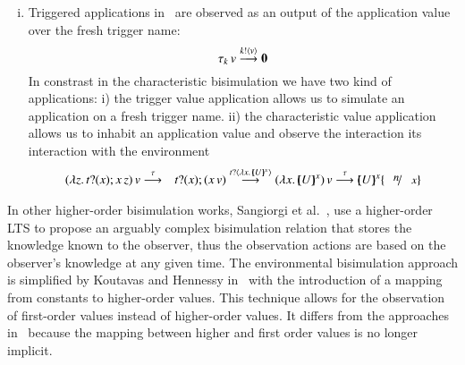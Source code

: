 \begin{enumerate}[i)]
	\item 	Triggered applications in~\cite{DBLP:journals/lmcs/JeffreyR05}
		are observed as an output of the application
		value over the fresh trigger name:
		\[
			\tau_k\,v \stackrel{k ! \langle v \rangle}{\longrightarrow} \mathbf{0}
		\]
		In constrast in the characteristic bisimulation
		we have two kind of applications:
		i) the trigger value application allows us
		to simulate an application on a fresh trigger name.
		ii) the characteristic value application
		allows us to inhabit an application value 
		and observe the interaction its interaction
		with the environment
		\begin{eqnarray*}
			\appl{(\abs{z}{\binp{t}{x} \appl{x}{z}})}{v} &\by{\tau}& \binp{t}{x} (\appl{x}{v})
			\by{\bactinp{t}{\abs{x}{\mapchar{U}{x}}}}
			\appl{(\abs{x}{\mapchar{U}{x}})}{v}
			\by{\tau} \mapchar{U}{x} \subst{n}{x}
		\end{eqnarray*}
\end{enumerate}



In other higher-order bisimulation works, Sangiorgi et al.~\cite{DBLP:conf/lics/SangiorgiKS07}, use a higher-order LTS 
to propose an arguably complex bisimulation relation that stores the knowledge known to
the observer, thus the observation actions are based on the observer's knowledge
at any given time. 
The environmental bisimulation approach is simplified by Koutavas and
Hennessy in~\cite{DBLP:journals/cl/KoutavasH12,DBLP:conf/esop/KoutavasH11}
with the introduction
of a mapping from constants to higher-order values. This
technique allows for the observation of first-order values instead
of higher-order values. It differs from the approaches
in~\cite{San96H,DBLP:journals/lmcs/JeffreyR05} because the
mapping between higher and first order values is no longer implicit.


